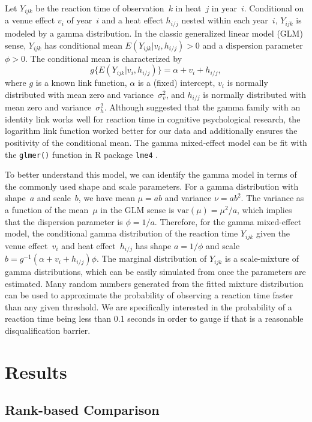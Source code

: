 \documentclass[12pt, letterpaper]{article}
\begin{document}
Let $Y_{ijk}$ be the reaction time of observation~$k$ in heat~$j$ in year~$i$.
Conditional on a venue effect $v_i$ of year~$i$ and a heat effect
$h_{i/j}$ nested within each year~$i$, $Y_{ijk}$ is modeled by a
gamma distribution. In the classic generalized linear model (GLM) sense,
$Y_{ijk}$ has conditional mean $E(Y_{ijk} | v_i, h_{i/j}) > 0$ and a
dispersion parameter~$\phi > 0$. The conditional mean is characterized by
\[
g\{E(Y_{ijk} | v_i, h_{i/j})\} = \alpha + v_i + h_{i/j},
\]
where $g$ is a known link function, $\alpha$ is a (fixed) intercept,
$v_i$ is normally distributed with mean zero and
variance~$\sigma_v^2$, and $h_{i/j}$ 
is normally distributed with mean
zero and variance~$\sigma_h^2$.
Although \citet{lo2015idlink} suggested that the gamma 
family with an identity link works well for reaction time in cognitive
psychological research, the logarithm
link function worked better for our data and additionally ensures the positivity
of the conditional mean. The gamma mixed-effect model can be fit with the 
\texttt{glmer()} function in R package \texttt{lme4} \citep{lme4}.


To better understand this model, we can identify the gamma model in terms of the
commonly used shape and scale parameters. For a gamma distribution with
shape~$a$ and scale~$b$, we have mean $\mu = ab$ and variance $\nu = ab^2$. The
variance as a function of the mean~$\mu$ in the GLM sense is
$\text{var}(\mu) = \mu^2 / a$, which implies that the dispersion parameter is
$\phi = 1 / a$. Therefore, for the gamma mixed-effect model, the conditional
gamma distribution of the reaction time $Y_{ijk}$ given the venue
effect~$v_i$ and heat effect~$h_{i/j}$
has shape $a = 1 / \phi$ and scale
$b = g^{-1}(\alpha + v_i + h_{i/j}) \phi$. The marginal
distribution of $Y_{ijk}$ is a scale-mixture of gamma distributions, which can be
easily simulated from once the parameters are estimated. Many
random numbers generated from the fitted mixture distribution can be used to
approximate the probability of observing a reaction time faster than any given
threshold. We are specifically interested in the probability of a reaction time
being less than 0.1 seconds in order to gauge if that is a reasonable 
disqualification barrier.


\section{Results} \label{sec:Results}

\subsection{Rank-based Comparison} \label{subsec:Results_Rank}
\end{document}
